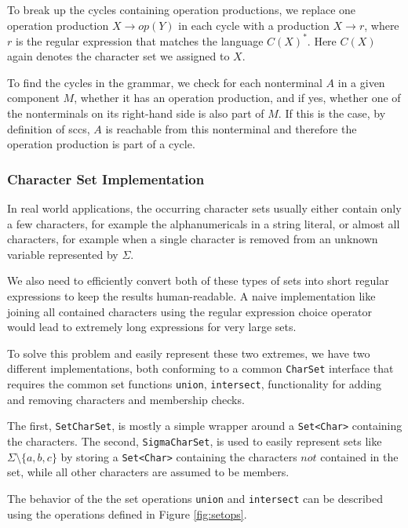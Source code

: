 To break up the cycles containing operation productions, we replace one operation production $X \rightarrow op(Y)$ in each cycle with a production $X \rightarrow r$, where $r$ is the regular expression that matches the language $C(X)^*$. Here $C(X)$ again denotes the character set we assigned to $X$.

To find the cycles in the grammar, we check for each nonterminal $A$ in a given component $M$, whether it has an operation production, and if yes, whether one of the nonterminals on its right-hand side is also part of $M$. If this is the case, by definition of \acp{scc}, $A$ is reachable from this nonterminal and therefore the operation production is part of a cycle.

\subsubsection{Character Set Implementation}

In real world applications, the occurring character sets usually either contain only a few characters, for example the alphanumericals in a string literal, or almost all characters, for example when a single character is removed from an unknown variable represented by $\Sigma$.

We also need to efficiently convert both of these types of sets into short regular expressions to keep the results human-readable. A naive implementation like joining all contained characters using the regular expression choice operator would lead to extremely long expressions for very large sets.

To solve this problem and easily represent these two extremes, we have two different implementations, both conforming to a common \lstinline|CharSet| interface that requires the common set functions \lstinline|union|, \lstinline|intersect|, functionality for adding and removing characters and membership checks.

The first, \lstinline|SetCharSet|, is mostly a simple wrapper around a \lstinline|Set<Char>| containing the characters.
The second, \lstinline|SigmaCharSet|, is used to easily represent sets like $\Sigma \setminus \{a, b, c\}$ by storing a \lstinline|Set<Char>| containing the characters $not$ contained in the set, while all other characters are assumed to be members.

The behavior of the the set operations \lstinline|union| and \lstinline|intersect| can be described using the operations defined in Figure \ref{fig:setops}.


